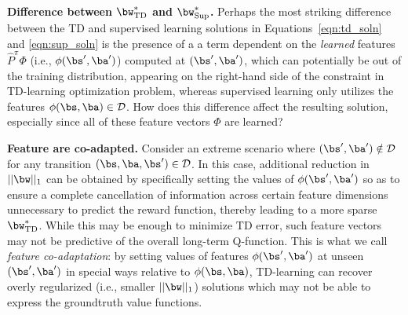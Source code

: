 \textbf{Difference between $\bw^*_{\mathrm{TD}}$ and $\bw^*_{\mathrm{Sup}}$.} Perhaps the most striking difference between the TD and supervised learning solutions in Equations~\ref{eqn:td_soln} and \ref{eqn:sup_soln} is the presence of a a term dependent on the \emph{learned} features $\hat{P}^\pi \Phi$ (i.e., $\phi(\bs', \ba')$) computed at $(\bs', \ba')$, which can potentially be out of the training distribution, appearing on the right-hand side of the constraint in TD-learning optimization problem, whereas supervised learning only utilizes the features $\phi(\bs, \ba) \in \mathcal{D}$.
How does this difference affect the resulting solution, especially since all of these feature vectors $\Phi$ are learned?  

\textbf{Feature are co-adapted.} Consider an extreme scenario where $(\bs', \ba') \notin \mathcal{D}$ for any transition $(\bs, \ba, \bs') \in \mathcal{D}$. In this case, additional reduction in $||\bw||_1$ can be obtained by specifically setting the values of $\phi(\bs', \ba')$ so as to ensure a complete cancellation of information across certain feature dimensions unnecessary to predict the reward function,
thereby leading to a more sparse $\bw^*_{\mathrm{TD}}$. While this may be enough to minimize TD error, such feature vectors may not be predictive of the overall long-term Q-function. This is what we call \emph{feature co-adaptation}: by setting values of features $\phi(\bs', \ba')$ at unseen $(\bs', \ba')$ in special ways relative to $\phi(\bs, \ba)$, TD-learning can recover overly regularized (i.e., smaller $||\bw||_1$) solutions which may not be able to express the groundtruth value functions. 

